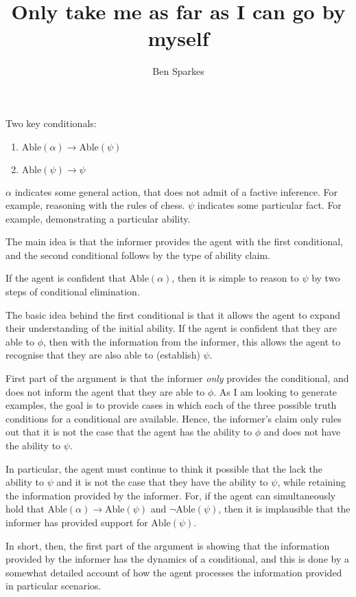 \documentclass[10pt]{article}
\title{Only take me as far as I can go by myself}
\author{Ben Sparkes}
\begin{document}
\tableofcontents

\newpage

Two key conditionals:
\begin{enumerate}
\item \(\text{Able}(\alpha) \rightarrow \text{Able}(\psi)\)
\item \(\text{Able}(\psi) \rightarrow \psi\)
\end{enumerate}

\(\alpha\) indicates some general action, that does not admit of a factive inference.
For example, reasoning with the rules of chess.
\(\psi\) indicates some particular fact.
For example, demonstrating a particular ability.

The main idea is that the informer provides the agent with the first conditional, and the second conditional follows by the type of ability claim.

If the agent is confident that \(\text{Able}(\alpha)\), then it is simple to reason to \(\psi\) by two steps of conditional elimination.

The basic idea behind the first conditional is that it allows the agent to expand their understanding of the initial ability.
If the agent is confident that they are able to \(\phi\), then with the information from the informer, this allows the agent to recognise that they are also able to (establish) \(\psi\).

First part of the argument is that the informer \emph{only} provides the conditional, and does not inform the agent that they are able to \(\phi\).
As I am looking to generate examples, the goal is to provide cases in which each of the three possible truth conditions for a conditional are available.
Hence, the informer's claim only rules out that it is not the case that the agent has the ability to \(\phi\) and does not have the ability to \(\psi\).

In particular, the agent must continue to think it possible that the lack the ability to \(\psi\) and it is not the case that they have the ability to \(\psi\), while retaining the information provided by the informer.
For, if the agent can simultaneously hold that \(\text{Able}(\alpha) \rightarrow \text{Able}(\psi)\) and \(\lnot\text{Able}(\psi)\), then it is implausible that the informer has provided support for \(\text{Able}(\psi)\).

In short, then, the first part of the argument is showing that the information provided by the informer has the dynamics of a conditional, and this is done by a somewhat detailed account of how the agent processes the information provided in particular scenarios.
\end{document}
